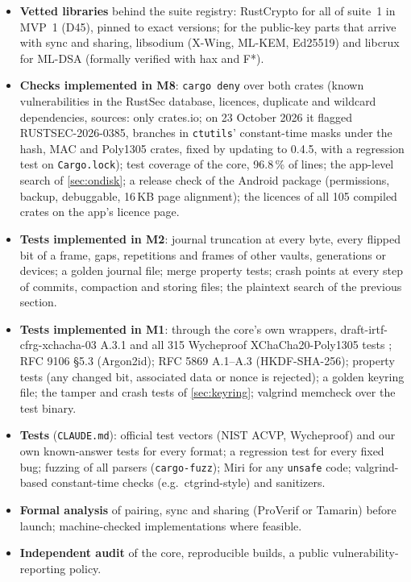 \documentclass[11pt,a4paper]{article}
\newcommand{\dref}[1]{\textsf{#1}} %
\begin{document}
\begin{itemize}
  \item \textbf{Vetted libraries} behind the suite registry: RustCrypto for all of suite~1 in MVP~1 (\dref{D45}), pinned to exact versions; for the public-key parts that arrive with sync and sharing, libsodium (X-Wing, ML-KEM, Ed25519) and libcrux for ML-DSA (formally verified with hax and F*).
  \item \textbf{Checks implemented in M8}: \texttt{cargo deny} over both crates (known vulnerabilities in the RustSec database, licences, duplicate and wildcard dependencies, sources: only crates.io; on 23 October 2026 it flagged RUSTSEC-2026-0385, branches in \texttt{ctutils}' constant-time masks under the hash, MAC and Poly1305 crates, fixed by updating to 0.4.5, with a regression test on \texttt{Cargo.lock}); test coverage of the core, 96.8\,\% of lines; the app-level search of \cref{sec:ondisk}; a release check of the Android package (permissions, backup, debuggable, 16\,KB page alignment); the licences of all 105 compiled crates on the app's licence page.
  \item \textbf{Tests implemented in M2}: journal truncation at every byte, every flipped bit of a frame, gaps, repetitions and frames of other vaults, generations or devices; a golden journal file; merge property tests; crash points at every step of commits, compaction and storing files; the plaintext search of the previous section.
  \item \textbf{Tests implemented in M1}: through the core's own wrappers, draft-irtf-cfrg-xchacha-03 A.3.1 \cite{xchacha} and all 315 Wycheproof XChaCha20-Poly1305 tests \cite{wycheproof}; RFC 9106 §5.3 (Argon2id); RFC 5869 A.1--A.3 (HKDF-SHA-256); property tests (any changed bit, associated data or nonce is rejected); a golden keyring file; the tamper and crash tests of \cref{sec:keyring}; valgrind memcheck over the test binary.
  \item \textbf{Tests} (\texttt{CLAUDE.md}): official test vectors (NIST ACVP, Wycheproof) and our own known-answer tests for every format; a regression test for every fixed bug; fuzzing of all parsers (\texttt{cargo-fuzz}); Miri for any \texttt{unsafe} code; valgrind-based constant-time checks (e.g.\ ctgrind-style) and sanitizers.
  \item \textbf{Formal analysis} of pairing, sync and sharing (ProVerif or Tamarin) before launch; machine-checked implementations where feasible.
  \item \textbf{Independent audit} of the core, reproducible builds, a public vulnerability-reporting policy.
\end{itemize}
\end{document}
